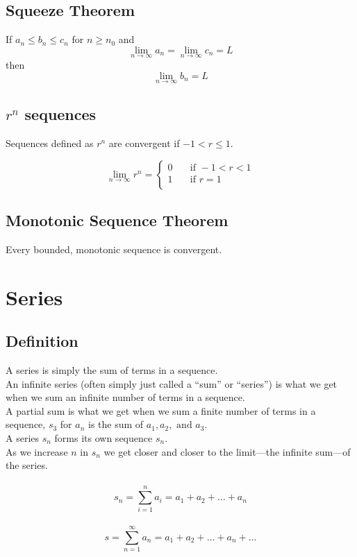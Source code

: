 \documentclass[12pt]{article}
\begin{document}
\subsection{Squeeze Theorem}

If $a_n \leq b_n \leq c_n$ for $n \geq n_0$ and
$$\lim_{n\to\infty} a_n = \lim_{n\to\infty} c_n = L$$
then
$$\lim_{n\to\infty} b_n = L$$


\subsection{${r^n}$ sequences}

Sequences defined as ${r^n}$ are convergent if $-1 < r \leq 1$.

\[ \lim_{n\to\infty} r^n =
    \begin{cases}
        0 & \quad \text{if } -1 < r < 1\\
        1 & \quad \text{if } r = 1\\
    \end{cases}
\]


\subsection{Monotonic Sequence Theorem}

Every bounded, monotonic sequence is convergent.


\section{Series}


\subsection{Definition}

A series is simply the sum of terms in a sequence.\\
An infinite series (often simply just called a ``sum'' or ``series'') is what we get when we sum an infinite number of terms in a sequence.\\
A partial sum is what we get when we sum a finite number of terms in a sequence, $s_3$ for ${a_n}$ is the sum of $a_1, a_2,\text{ and } a_3$.\\
A series $s_n$ forms its own sequence ${s_n}$.\\
As we increase $n$ in ${s_n}$ we get closer and closer to the limit---the infinite sum---of the series.\\
\\
\begin{displaymath}
s_n = \sum_{i=1}^{n} a_i = a_1 + a_2 + \dots + a_n
\end{displaymath}
\\
\begin{displaymath}
s = \sum_{n=1}^{\infty} a_n = a_1 + a_2 + \dots + a_n + \dots
\end{displaymath}
\end{document}
